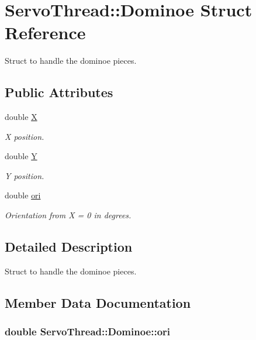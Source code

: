 \hypertarget{a00002}{}\section{Servo\+Thread\+:\+:Dominoe Struct Reference}
\label{a00002}


Struct to handle the dominoe pieces.  


\subsection*{Public Attributes}
\begin{DoxyCompactItemize}
\item 
double \hyperlink{a00002_a8caa44969c79e0e46576da349957975b}{X}
\begin{DoxyCompactList}\small\item\em X position. \end{DoxyCompactList}\item 
double \hyperlink{a00002_ae7711996c8204586b6d8a5e657c4b06a}{Y}
\begin{DoxyCompactList}\small\item\em Y position. \end{DoxyCompactList}\item 
double \hyperlink{a00002_a451efc4d2eb2f1dd10006c6c49846e8d}{ori}
\begin{DoxyCompactList}\small\item\em Orientation from X = 0 in degrees. \end{DoxyCompactList}\end{DoxyCompactItemize}


\subsection{Detailed Description}
Struct to handle the dominoe pieces. 

\subsection{Member Data Documentation}
\hypertarget{a00002_a451efc4d2eb2f1dd10006c6c49846e8d}{}
\subsubsection[{ori}]{\setlength{\rightskip}{0pt plus 5cm}double Servo\+Thread\+::\+Dominoe\+::ori}\label{a00002_a451efc4d2eb2f1dd10006c6c49846e8d}


